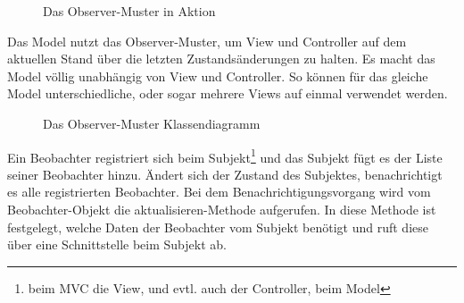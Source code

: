 \documentclass[11pt,a4paper,titlepage]{scrreprt}
\begin{document}
\enlargethispage{1cm}
\begin{figure}[h]
\caption{Das Observer-Muster in Aktion}
\end{figure}

Das Model nutzt das Observer-Muster, um View und Controller auf dem aktuellen
Stand über die letzten Zustandsänderungen zu halten.
Es macht das Model völlig unabhängig von View und Controller. So können für das gleiche
Model unterschiedliche, oder sogar mehrere Views auf einmal verwendet werden.

\begin{figure}[h]
\caption{Das Observer-Muster Klassendiagramm}
\end{figure}

Ein Beobachter registriert sich beim Subjekt\footnote{beim MVC die View, und evtl.
auch der Controller, beim Model} und das Subjekt fügt es der Liste seiner Beobachter
hinzu. Ändert sich der Zustand des Subjektes, benachrichtigt es alle registrierten
Beobachter. Bei dem Benachrichtigungsvorgang wird vom Beobachter-Objekt die
aktualisieren-Methode aufgerufen. In diese Methode ist festgelegt, welche Daten
der Beobachter vom Subjekt benötigt und ruft diese über eine Schnittstelle beim
Subjekt ab.
\end{document}

